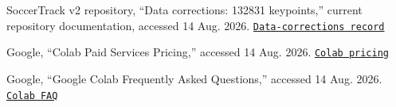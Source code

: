\documentclass[11pt,a4paper]{article}
\newcommand{\sourcelink}[2]{\href{#1}{\texttt{#2}}}
\begin{document}
\begin{multicols}{2}
\begin{thebibliography}{9}
SoccerTrack v2 repository, ``Data corrections: 132831 keypoints,'' current repository documentation, accessed 14 Aug. 2026.\newline
\sourcelink{https://github.com/AtomScott/SoccerTrack-v2/tree/main/data_corrections}{Data-corrections record}

Google, ``Colab Paid Services Pricing,'' accessed 14 Aug. 2026.\newline
\sourcelink{https://colab.research.google.com/signup}{Colab pricing}

Google, ``Google Colab Frequently Asked Questions,'' accessed 14 Aug. 2026.\newline
\sourcelink{https://research.google.com/colaboratory/faq.html}{Colab FAQ}

\end{thebibliography}
\end{multicols}
\end{document}
